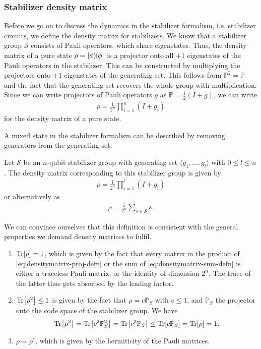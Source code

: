\subsubsection{Stabilizer density matrix}
Before we go on to discuss the dynamics in the stabilizer formalism, i.e.
stabilizer circuits, we define the density matrix for stabilizers. We know that
a stabilizer group $\mathcal{S}$ consists of Pauli operators, which share eigenstates. 
Thus, the density matrix of a pure state $\rho = \dyad{\phi}$ is a
projector onto all $+1$ eigenstates of the Pauli operators in the stabilizer.
This can be constructed by multiplying the projectors onto $+1$ eigenstates of
the generating set. This follows from $\mathbb{P}^2 = \mathbb{P}$ and the fact
that the generating set recovers the whole group with multiplication. Since we
can write projectors of Pauli operators $g$ as $\mathbb{P} = \frac{1}{2}(I+g)$,
we can write
\begin{align}
  \rho = \frac{1}{2^n} \prod_{i=1}^n (I + g_i)
\end{align}
for the density matrix of a pure state.

A mixed state in the stabilizer formalism can be described by removing
generators from the generating set. 
\begin{defn}\label{defn:stab-dmat}
  Let $\mathcal{S}$ be an $n$-qubit stabilizer group with generating set
  $\langle g_1, \ldots, g_l \rangle$ with $0 \leq l \leq n$. The density matrix
  corresponding to this stabilizer group is given by
  \begin{align}\label{eq:densitymatrix-proj-defn}
    \rho = \frac{1}{2^n} \prod_{i=1}^l (I + g_i)
  \end{align}
  or alternatively as
  \begin{align}\label{eq:densitymatrix-sum-defn}
    \rho = \frac{1}{2^n} \sum_{s \in \mathcal{S}} s
  .\end{align}
\end{defn}
We can convince ourselves that this definition is consistent with the general
properties we demand density matrices to fulfil. 
\begin{enumerate}
  \item $\Tr[\rho] = 1$, which is given by the fact that every matrix in the
    product of \cref{eq:densitymatrix-proj-defn} or the sum of
    \cref{eq:densitymatrix-sum-defn} is either a traceless Pauli matrix, or the
    identity of dimension $2^n$. The trace of the latter thus gets absorbed by
    the leading factor.
  \item $\Tr[\rho^2] \leq 1$ is given by the fact that $\rho = c\mathbb{P}_S$
    with $c\leq 1$, and $\mathbb{P}_S$ the projector onto the code space of the
    stabilizer group. We have
    \begin{align}
       \Tr[\rho^2]=\Tr[c^2 \mathbb{P}^2_S] =\Tr[c^2\mathbb{P}_S]
        \leq \Tr[c\mathbb{P}_S] = \Tr[\rho] = 1
    .\end{align}
  \item $\rho = \rho^\dagger$, which is given by the hermiticity of the Pauli
    matrices.
\end{enumerate}

